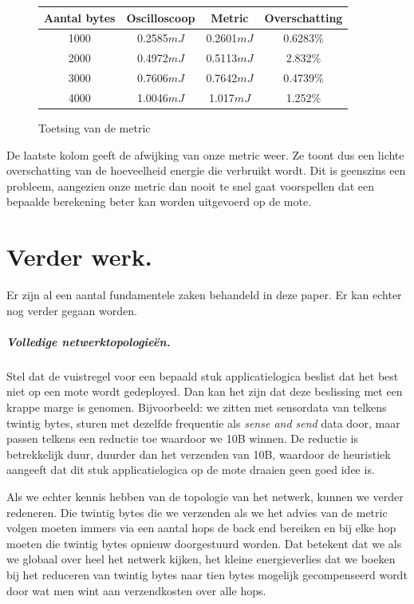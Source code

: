 \documentclass[11pt]{article}
\begin{document}
\begin{figure}[H]
\begin{tabular}{|c|c|c|c|}
\hline 
\cellcolor[gray]{0.8}Aantal bytes & \cellcolor[gray]{0.8} Oscilloscoop  & \cellcolor[gray]{0.8} Metric & \cellcolor[gray]{0.8} Overschatting \\ 
\hline 
1000 & 0.2585$mJ$ & 0.2601$mJ$ & 0.6283\% \\ 
\hline 
2000 & 0.4972$mJ$ & 0.5113$mJ$ & 2.832\% \\ 
\hline 
3000 & 0.7606$mJ$ & 0.7642$mJ$ & 0.4739\% \\ 
\hline 
4000 & 1.0046$mJ$ & 1.017$mJ$ & 1.252\% \\ 
\hline 
\end{tabular} 

\caption{Toetsing van de metric}
\label{tab:toetsing}
\end{figure}

De laatste kolom geeft de afwijking van onze metric weer. Ze toont dus een
lichte overschatting van de hoeveelheid energie die verbruikt wordt. Dit is
geenszins een probleem, aangezien onze metric dan nooit te snel gaat voorspellen dat
een bepaalde berekening beter kan worden uitgevoerd op de mote.

\section{Verder werk.} 

Er zijn al een aantal fundamentele zaken behandeld in deze paper. Er kan
echter nog verder gegaan worden.
 
\subparagraph{Volledige netwerktopologie\"en.}

Stel dat de vuistregel voor een bepaald stuk applicatielogica beslist dat het
best niet op een mote wordt gedeployed. Dan kan het zijn dat deze beslissing met
een krappe marge is genomen. Bijvoorbeeld: we zitten met sensordata van telkens
twintig bytes, sturen met dezelfde frequentie als \textit{sense and send} data door, maar
passen telkens een reductie toe waardoor we 10B winnen. De reductie is
betrekkelijk duur, duurder dan het verzenden van 10B, waardoor de heuristiek
aangeeft dat dit stuk applicatielogica op de mote draaien geen goed idee is. 

Als we echter kennis hebben van de topologie van het netwerk, kunnen we verder
redeneren. Die twintig bytes die we verzenden als we het advies van de metric
volgen moeten immers via een aantal hops de back end bereiken en bij elke hop
moeten die twintig bytes opnieuw doorgestuurd worden. Dat betekent dat we als we
globaal over heel het netwerk kijken, het kleine energieverlies dat we boeken
bij het reduceren van twintig bytes naar tien bytes mogelijk gecompenseerd wordt
door wat men wint aan verzendkosten over alle hops.
\end{document}
